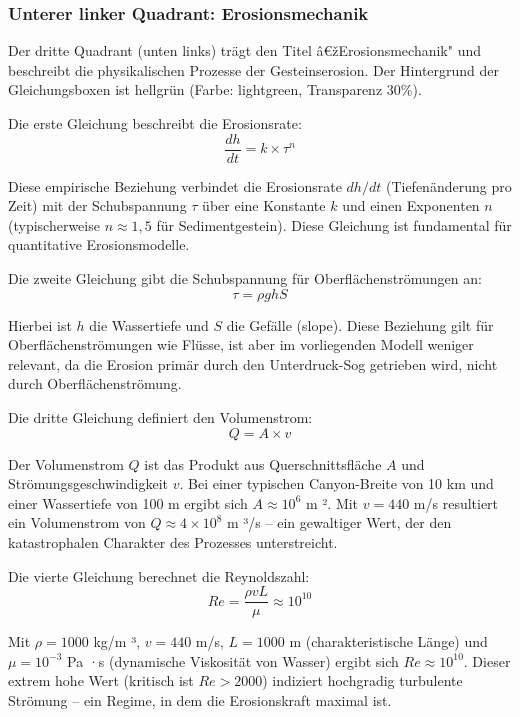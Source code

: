 \subsubsection*{Unterer linker Quadrant: Erosionsmechanik}

Der dritte Quadrant (unten links) trägt den Titel â€žErosionsmechanik" und beschreibt die physikalischen Prozesse der Gesteinserosion. Der Hintergrund der Gleichungsboxen ist hellgrün (Farbe: lightgreen, Transparenz 30\%).

Die erste Gleichung beschreibt die Erosionsrate:
\begin{equation*}
\frac{dh}{dt} = k \times \tau^n
\end{equation*}

Diese empirische Beziehung verbindet die Erosionsrate $dh/dt$ (Tiefenänderung pro Zeit) mit der Schubspannung $\tau$ über eine Konstante $k$ und einen Exponenten $n$ (typischerweise $n \approx 1{,}5$ für Sedimentgestein). Diese Gleichung ist fundamental für quantitative Erosionsmodelle.

Die zweite Gleichung gibt die Schubspannung für Oberflächenströmungen an:
\begin{equation*}
\tau = \rho g h S
\end{equation*}

Hierbei ist $h$ die Wassertiefe und $S$ die Gefälle (slope). Diese Beziehung gilt für Oberflächenströmungen wie Flüsse, ist aber im vorliegenden Modell weniger relevant, da die Erosion primär durch den Unterdruck-Sog getrieben wird, nicht durch Oberflächenströmung.

Die dritte Gleichung definiert den Volumenstrom:
\begin{equation*}
Q = A \times v
\end{equation*}

Der Volumenstrom $Q$ ist das Produkt aus Querschnittsfläche $A$ und Strömungsgeschwindigkeit $v$. Bei einer typischen Canyon-Breite von 10 km und einer Wassertiefe von 100 m ergibt sich $A \approx 10^6$ m ². Mit $v = 440$ m/s resultiert ein Volumenstrom von $Q \approx 4 \times 10^8$ m ³/s -- ein gewaltiger Wert, der den katastrophalen Charakter des Prozesses unterstreicht.

Die vierte Gleichung berechnet die Reynoldszahl:
\begin{equation*}
Re = \frac{\rho v L}{\mu} \approx 10^{10}
\end{equation*}

Mit $\rho = 1000$ kg/m ³, $v = 440$ m/s, $L = 1000$ m (charakteristische Länge) und $\mu = 10^{-3}$ Pa ·s (dynamische Viskosität von Wasser) ergibt sich $Re \approx 10^{10}$. Dieser extrem hohe Wert (kritisch ist $Re > 2000$) indiziert hochgradig turbulente Strömung -- ein Regime, in dem die Erosionskraft maximal ist.

